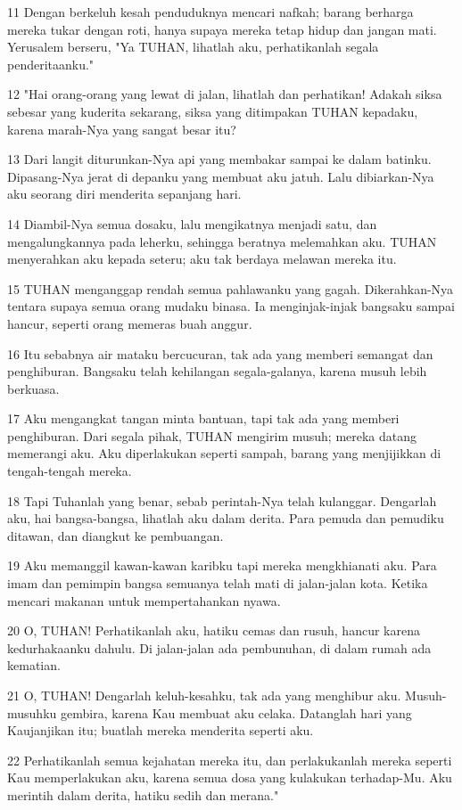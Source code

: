 \par 11 Dengan berkeluh kesah penduduknya mencari nafkah; barang berharga mereka tukar dengan roti, hanya supaya mereka tetap hidup dan jangan mati. Yerusalem berseru, "Ya TUHAN, lihatlah aku, perhatikanlah segala penderitaanku."
\par 12 "Hai orang-orang yang lewat di jalan, lihatlah dan perhatikan! Adakah siksa sebesar yang kuderita sekarang, siksa yang ditimpakan TUHAN kepadaku, karena marah-Nya yang sangat besar itu?
\par 13 Dari langit diturunkan-Nya api yang membakar sampai ke dalam batinku. Dipasang-Nya jerat di depanku yang membuat aku jatuh. Lalu dibiarkan-Nya aku seorang diri menderita sepanjang hari.
\par 14 Diambil-Nya semua dosaku, lalu mengikatnya menjadi satu, dan mengalungkannya pada leherku, sehingga beratnya melemahkan aku. TUHAN menyerahkan aku kepada seteru; aku tak berdaya melawan mereka itu.
\par 15 TUHAN menganggap rendah semua pahlawanku yang gagah. Dikerahkan-Nya tentara supaya semua orang mudaku binasa. Ia menginjak-injak bangsaku sampai hancur, seperti orang memeras buah anggur.
\par 16 Itu sebabnya air mataku bercucuran, tak ada yang memberi semangat dan penghiburan. Bangsaku telah kehilangan segala-galanya, karena musuh lebih berkuasa.
\par 17 Aku mengangkat tangan minta bantuan, tapi tak ada yang memberi penghiburan. Dari segala pihak, TUHAN mengirim musuh; mereka datang memerangi aku. Aku diperlakukan seperti sampah, barang yang menjijikkan di tengah-tengah mereka.
\par 18 Tapi Tuhanlah yang benar, sebab perintah-Nya telah kulanggar. Dengarlah aku, hai bangsa-bangsa, lihatlah aku dalam derita. Para pemuda dan pemudiku ditawan, dan diangkut ke pembuangan.
\par 19 Aku memanggil kawan-kawan karibku tapi mereka mengkhianati aku. Para imam dan pemimpin bangsa semuanya telah mati di jalan-jalan kota. Ketika mencari makanan untuk mempertahankan nyawa.
\par 20 O, TUHAN! Perhatikanlah aku, hatiku cemas dan rusuh, hancur karena kedurhakaanku dahulu. Di jalan-jalan ada pembunuhan, di dalam rumah ada kematian.
\par 21 O, TUHAN! Dengarlah keluh-kesahku, tak ada yang menghibur aku. Musuh-musuhku gembira, karena Kau membuat aku celaka. Datanglah hari yang Kaujanjikan itu; buatlah mereka menderita seperti aku.
\par 22 Perhatikanlah semua kejahatan mereka itu, dan perlakukanlah mereka seperti Kau memperlakukan aku, karena semua dosa yang kulakukan terhadap-Mu. Aku merintih dalam derita, hatiku sedih dan merana."

